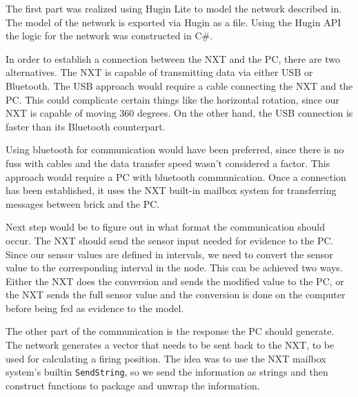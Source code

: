 The first part was realized using Hugin Lite to model the network described in\label{MID}. The model of the network is exported via Hugin as a file. Using the Hugin API the logic for the network was constructed in C\#.\nl

In order to establish a connection between the NXT and the PC, there are two alternatives. The NXT is capable of transmitting data via either USB or Bluetooth.
The USB approach would require a cable connecting the NXT and the PC. This could complicate certain things like the horizontal rotation, since our NXT is capable of moving 360 degrees. On the other hand, the USB connection is faster than its Bluetooth counterpart.\nl

Using bluetooth for communication would have been preferred, since there is no fuss with cables and the data transfer speed wasn't considered a factor. This approach would require a PC with bluetooth communication. Once a connection has been established, it uses the NXT built-in mailbox system for transferring messages between brick and
the PC.\nl

Next step would be to figure out in what format the communication should occur. The NXT should send the sensor input needed for evidence to the PC. Since our sensor values are defined in intervals, we need to convert the sensor value to the corresponding interval in the node. This can be achieved two ways. Either the NXT does the conversion and sends the modified value to the PC, or the NXT sends the full sensor value and the conversion is done on the computer before being fed as evidence to the model.\nl

The other part of the communication is the response the PC should generate. The network generates a vector that needs to be sent back to the NXT, to be used for calculating a firing position. The idea was to use the NXT mailbox system's builtin \texttt{SendString}, so we send the information as strings and then construct functions to package and unwrap the information.


